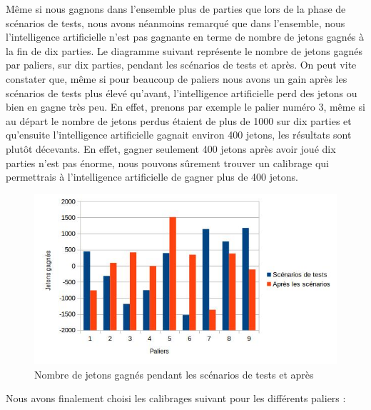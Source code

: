 \documentclass{report}
\begin{document}
Même si nous gagnons dans l'ensemble plus de parties que lors de la phase de scénarios de tests, nous avons néanmoins remarqué que dans l'ensemble, nous l'intelligence artificielle n'est pas gagnante en terme de nombre de jetons gagnés à la fin de dix parties. Le diagramme suivant représente le nombre de jetons gagnés par paliers, sur dix parties, pendant les scénarios de tests et après. On peut vite constater que, même si pour beaucoup de paliers nous avons un gain après les scénarios de tests plus élevé qu'avant, l'intelligence artificielle perd des jetons ou bien en gagne très peu. En effet, prenons par exemple le palier numéro 3, même si au départ le nombre de jetons perdus étaient de plus de 1000 sur dix parties et qu'ensuite l'intelligence artificielle gagnait environ 400 jetons, les résultats sont plutôt décevants. En effet, gagner seulement 400 jetons après avoir joué dix parties n'est pas énorme, nous pouvons sûrement trouver un calibrage qui permettrais à l'intelligence artificielle de gagner plus de 400 jetons.\par


\begin{figure}[H]
	\begin{center}
		\includegraphics[scale=0.5]{./imagesRapport/PremierCalibrageComparaisonJetonsGagnees.jpg}
	\end{center}
	\caption{Nombre de jetons gagnés pendant les scénarios de tests et après}
\end{figure}

Nous avons finalement choisi les calibrages suivant pour les différents paliers :
\end{document}
